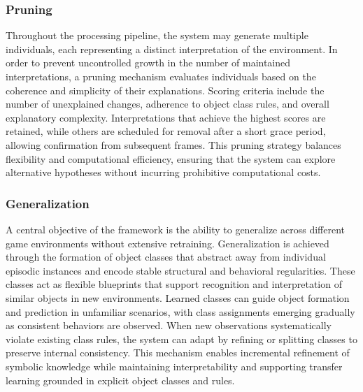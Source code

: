 \documentclass[12pt,a4paper]{report}
\begin{document}
\subsubsection{Pruning}
Throughout the processing pipeline, the system may generate multiple individuals, each representing a distinct interpretation of the environment. In order to prevent uncontrolled growth in the number of maintained interpretations, a pruning mechanism evaluates individuals based on the coherence and simplicity of their explanations.
Scoring criteria include the number of unexplained changes, adherence to object class rules, and overall explanatory complexity. Interpretations that achieve the highest scores are retained, while others are scheduled for removal after a short grace period, allowing confirmation from subsequent frames.
This pruning strategy balances flexibility and computational efficiency, ensuring that the system can explore alternative hypotheses without incurring prohibitive computational costs.

\subsubsection{Generalization}
A central objective of the framework is the ability to generalize across different game environments without extensive retraining. Generalization is achieved through the formation of object classes that abstract away from individual episodic instances and encode stable structural and behavioral regularities.
These classes act as flexible blueprints that support recognition and interpretation of similar objects in new environments. Learned classes can guide object formation and prediction in unfamiliar scenarios, with class assignments emerging gradually as consistent behaviors are observed.
When new observations systematically violate existing class rules, the system can adapt by refining or splitting classes to preserve internal consistency. This mechanism enables incremental refinement of symbolic knowledge while maintaining interpretability and supporting transfer learning grounded in explicit object classes and rules.
\end{document}
